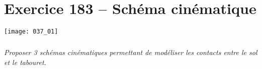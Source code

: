 \section*{Exercice 183 -- Schéma cinématique}
\setcounter{exo}{0}


\begin{center}
\texttt{[image: 037\_01]}
\end{center}

\subparagraph{}
\textit{Proposer 3 schémas cinématiques permettant de modéliser les contacts entre le sol et le tabouret.}
\ifprof
\begin{corrige}

\end{corrige}
\else
\fi
